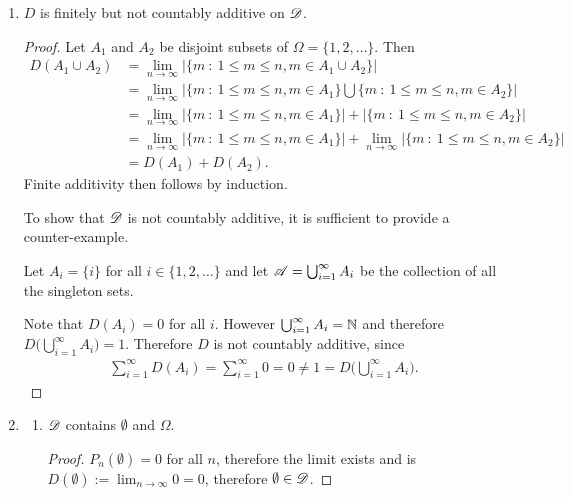 \begin{enumerate}
\begin{mdframed}
  \end{mdframed}

  \begin{enumerate}[label=(\alph*)]

  \item
    \begin{claim*}
      $D$ is finitely but not countably additive on $\mathscr D$.
    \end{claim*}
    \begin{proof}
      Let $A_1$ and $A_2$ be disjoint subsets of $\Omega = \{1, 2, \ldots\}$. Then
      \begin{align*}
        D(A_1 \cup A_2)
        &= \lim_{n\to\infty} \big|\big\{m ~:~ 1 \leq m \leq n, m \in A_1 \cup A_2 \big\}\big| \\
        &= \lim_{n\to\infty} \big|\big\{m ~:~ 1 \leq m \leq n, m \in A_1 \big\} \bigcup \big\{m ~:~ 1 \leq m \leq n, m \in A_2 \big\}\big|\\
        &= \lim_{n\to\infty} \big|\big\{m ~:~ 1 \leq m \leq n, m \in A_1 \big\}\big| + \big|\big\{m ~:~ 1 \leq m \leq n, m \in A_2 \big\}\big| \\
        &= \lim_{n\to\infty} \big|\big\{m ~:~ 1 \leq m \leq n, m \in A_1 \big\}\big| + \lim_{n\to\infty} \big|\big\{m ~:~ 1 \leq m \leq n, m \in A_2 \big\}\big| \\
        &= D(A_1) + D(A_2).
      \end{align*}
      Finite additivity then follows by induction.

      To show that $\mathscr D$ is not countably additive, it is sufficient to provide a counter-example.

      Let $A_i = \{i\}$ for all $i \in \{1, 2, \ldots\}$ and let $\mathscr A = \bigcup_{i=1}^\infty A_i$ be the collection of all the singleton sets.

      Note that $D(A_i) = 0$ for all $i$. However $\bigcup_{i=1}^\infty A_i = \mathbb{N}$ and
      therefore $D\big(\bigcup_{i=1}^\infty A_i\big) = 1$. Therefore $D$ is not countably additive, since
      \begin{align*}
        \sum_{i=1}^\infty D(A_i) = \sum_{i=1}^\infty 0 = 0 \neq 1 = D\big(\bigcup_{i=1}^\infty A_i\big).
      \end{align*}
    \end{proof}

  \item
    \begin{enumerate}
    \item
      \begin{claim*}
        $\mathscr D$ contains $\emptyset$ and $\Omega$.
      \end{claim*}
      \begin{proof}
        $P_n(\emptyset) = 0$ for all $n$, therefore the limit exists and
        is $D(\emptyset) := \lim_{n\to\infty} 0 = 0$, therefore $\emptyset \in \mathscr D$.


\end{proof}
\end{enumerate}
\end{enumerate}
\end{enumerate}
